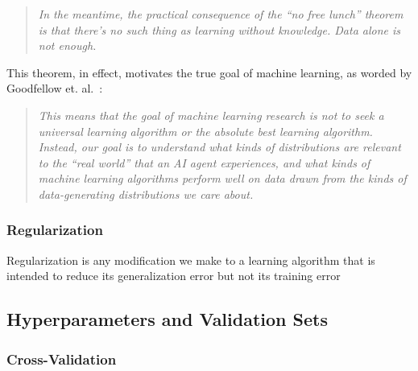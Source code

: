 \begin{quotation}
    \textit{In the meantime, the practical consequence of the “no free lunch”
    theorem is that there’s no such thing as learning without knowledge. Data
    alone is not enough.}
\end{quotation}

This theorem, in effect, motivates the true goal of machine learning, as worded
by Goodfellow et. al.~\cite[p.~116]{Goodfellow-et-al-2016}:

\begin{quotation}
    \textit{This means that the goal of machine learning research is not to seek
    a universal learning algorithm or the absolute best learning algorithm.
    Instead, our goal is to understand what kinds of distributions are relevant
    to the “real world” that an AI agent experiences, and what kinds of machine
    learning algorithms perform well on data drawn from the kinds of
    data-generating distributions we care about.}
\end{quotation}

\subsubsection{Regularization}

Regularization is any modification we make to a learning algorithm that is
intended to reduce its generalization error but not its training error

\subsection{Hyperparameters and Validation Sets}



\subsubsection{Cross-Validation}

